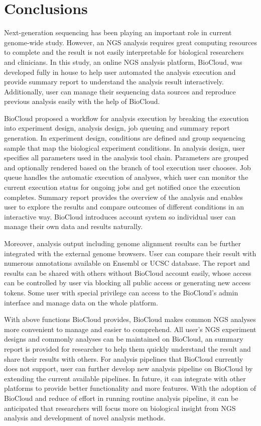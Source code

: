 \chapter{Conclusions}
\label{c:conclusion}

Next-generation sequencing has been playing an important role in current
genome-wide study. However, an NGS analysis requires great computing resources
to complete and the result is not easily interpretable for biological
researchers and clinicians. In this study, an online NGS analysis platform,
BioCloud, was developed fully in house to help user automated the analysis
execution and provide summary report to understand the analysis result
interactively.  Additionally, user can manage their sequencing data sources and
reproduce previous analysis easily with the help of BioCloud.

BioCloud proposed a workflow for analysis execution by breaking the execution
into experiment design, analysis design, job queuing and summary report
generation. In experiment design, conditions are defined and group sequencing
sample that map the biological experiment conditions. In analysis design, user
specifies all parameters used in the analysis tool chain. Parameters are
grouped and optionally rendered based on the branch of tool execution user
chooses. Job queue handles the automatic execution of analyses, which user can
monitor the current execution status for ongoing jobs and get notified once the
execution completes. Summary report provides the overview of the analysis and
enables user to explore the results and compare outcomes of different
conditions in an interactive way. BioCloud introduces account system so
individual user can manage their own data and results naturally.

Moreover, analysis output including genome alignment results can be further
integrated with the external genome browsers. User can compare their result
with numerous annotations available on Ensembl or UCSC database. The report and
results can be shared with others without BioCloud account easily, whose access
can be controlled by user via blocking all public access or generating new
access tokens. Some user with special privilege can access to the BioCloud's
admin interface and manage data on the whole platform.


With above functions BioCloud provides, BioCloud makes common NGS analyses more
convenient to manage and easier to comprehend. All user's NGS experiment
designs and commonly analyses can be maintained on BioCloud, an summary report
is provided for researcher to help them quickly understand the result and share
their results with others. For analysis pipelines that BioCloud currently does
not support, user can further develop new analysis pipeline on BioCloud by
extending the current available pipelines. In future, it can integrate with
other platforms to provide better functionality and more features. With the
adoption of BioCloud and reduce of effort in running routine analysis pipeline,
it can be anticipated that researchers will focus more on biological insight
from NGS analysis and development of novel analysis methods.

